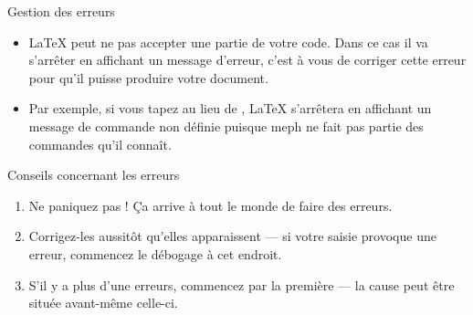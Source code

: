 \documentclass{beamer}
\begin{document}
\begin{frame}[fragile]{Gestion des erreurs}
\begin{itemize}
\item \LaTeX{} peut ne pas accepter une partie de votre code. Dans ce cas
il va s'arrêter en affichant un message d'erreur, c'est à vous de corriger
cette erreur pour qu'il puisse produire votre document.
\item Par exemple, si vous tapez  au lieu de , \LaTeX{} s'arrêtera
en affichant un message de \og{}commande non définie\fg{} puisque \og{}meph\fg{} ne fait
pas partie des commandes qu'il connaît.
\end{itemize}
\begin{block}{Conseils concernant les erreurs}
\begin{enumerate}
\item Ne paniquez pas ! Ça arrive à tout le monde de faire des erreurs.
\item Corrigez-les aussitôt qu'elles apparaissent --- si votre saisie provoque une erreur, commencez le débogage à cet endroit.
\item S'il y a plus d'une erreurs, commencez par la première --- la cause peut être située avant-même celle-ci.
\end{enumerate}
\end{block}
\end{frame}

\end{document}
